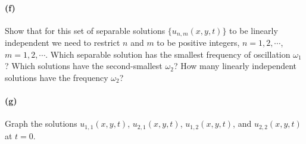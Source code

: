 \documentclass{article}
\begin{document}
\paragraph{(f)}		\extrapart
Show that for this set of separable solutions $\{u_{n,m}(x,y,t)\}$ to be linearly independent we need to restrict $n$ and $m$ to be positive integers, $n=1,2,\cdots$, $m=1,2,\cdots$.
Which separable solution has the smallest frequency of oscillation $\omega_{1}$?  Which solutions have the second-smallest $\omega_{2}$?  
How many linearly independent solutions have the frequency $\omega_{2}$?

\phline
\paragraph{(g)}
Graph the solutions $u_{1,1}(x,y,t)$, $u_{2,1}(x,y,t)$, $u_{1,2}(x,y,t)$, and $u_{2,2}(x,y,t)$ at $t=0$.  
\end{document}
